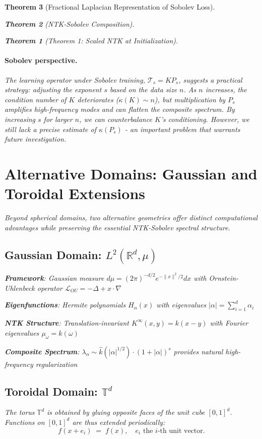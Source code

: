 \documentclass{article}
\newtheorem{theorem}{Theorem}[section]
\begin{document}
\begin{theorem}[Fractional Laplacian Representation of Sobolev Loss]
\begin{theorem}[NTK-Sobolev Composition]
\begin{theorem}[Theorem 1: Scaled NTK at Initialization]
\paragraph{Sobolev perspective.} The learning operator under Sobolev training, $\mathcal T_s = KP_s$, suggests a practical strategy: adjusting the exponent $s$ based on the data size $n$. As $n$ increases, the condition number of $K$ deteriorates ($\kappa(K)\sim n$), but multiplication by $P_s$ amplifies high-frequency modes and can flatten the composite spectrum. By increasing $s$ for larger $n$, we can counterbalance $K$'s conditioning. However, we still lack a precise estimate of $\kappa(P_s)$ - an important problem that warrants future investigation.

\newpage






\section{Alternative Domains: Gaussian and Toroidal Extensions}

Beyond spherical domains, two alternative geometries offer distinct computational advantages while preserving the essential NTK-Sobolev spectral structure.

\subsection{Gaussian Domain: $L^2(\mathbb{R}^d, \mu)$}

\textbf{Framework}: Gaussian measure $d\mu = (2\pi)^{-d/2} e^{-\|x\|^2/2} dx$ with Ornstein-Uhlenbeck operator $\mathcal{L}_{OU} = -\Delta + x \cdot \nabla$

\textbf{Eigenfunctions}: Hermite polynomials $H_{\alpha}(x)$ with eigenvalues $|\alpha| = \sum_{i=1}^d \alpha_i$

\textbf{NTK Structure}: Translation-invariant $K^{\infty}(x, y) = k(x - y)$ with Fourier eigenvalues $\mu_\omega = \hat{k}(\omega)$

\textbf{Composite Spectrum}: $\lambda_\alpha \sim \hat{k}(|\alpha|^{1/2}) \cdot (1 + |\alpha|)^s$ provides natural high-frequency regularization

\subsection{Toroidal Domain: $\mathbb{T}^d$}

The torus $\mathbb{T}^d$ is obtained by gluing opposite faces of the unit cube $[0,1]^d$.  Functions on $[0,1]^d$ are thus extended periodically:
\[
  f(x+e_i) \;=\; f(x), \quad e_i \text{ the } i\text{-th unit vector.}
\]


\end{theorem}
\end{theorem}
\end{theorem}
\end{document}
